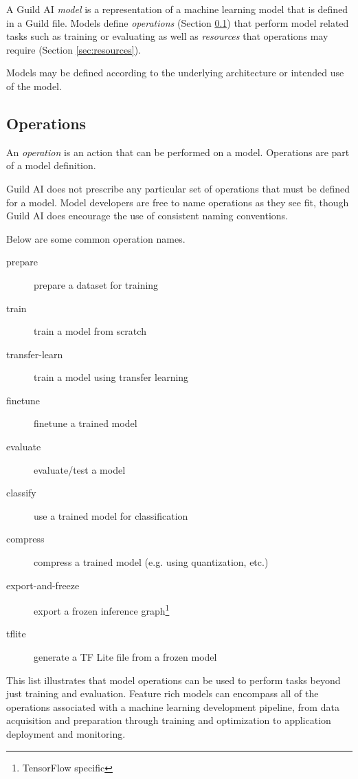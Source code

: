 \documentclass{article}
\begin{document}
A Guild AI \emph{model} is a representation of a machine learning
model that is defined in a Guild file. Models define \emph{operations}
(Section \ref{sec:operations}) that perform model related tasks such
as training or evaluating as well as \emph{resources} that operations
may require (Section \ref{sec:resources}).

Models may be defined according to the underlying architecture or
intended use of the model.

\subsection{Operations}
\label{sec:operations}

An \emph{operation} is an action that can be performed on a
model. Operations are part of a model definition.

Guild AI does not prescribe any particular set of operations that must
be defined for a model. Model developers are free to name operations
as they see fit, though Guild AI does encourage the use of consistent
naming conventions.

Below are some common operation names.

\begin{description}
\item[prepare] prepare a dataset for training
\item[train] train a model from scratch
\item[transfer-learn] train a model using transfer learning
\item[finetune] finetune a trained model
\item[evaluate] evaluate/test a model
\item[classify] use a trained model for classification
\item[compress] compress a trained model (e.g. using quantization,
  etc.)
\item[export-and-freeze] export a frozen inference
  graph\footnote{TensorFlow specific}
\item[tflite] generate a TF Lite file from a frozen
  model\footnotemark[\value{footnote}]
\end{description}

This list illustrates that model operations can be used to perform
tasks beyond just training and evaluation. Feature rich models can
encompass all of the operations associated with a machine learning
development pipeline, from data acquisition and preparation through
training and optimization to application deployment and monitoring.
\end{document}
